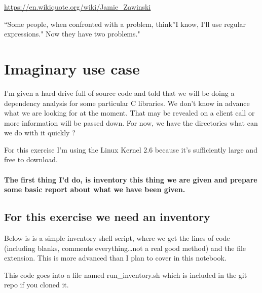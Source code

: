 \documentclass{article}
\begin{document}
\url{https://en.wikiquote.org/wiki/Jamie\_Zawinski}

``Some people, when confronted with a problem, think''I know, I'll use
regular expressions." Now they have two problems."

    \section{Imaginary use case}\label{imaginary-use-case}

I'm given a hard drive full of source code and told that we will be
doing a dependency analysis for some particular C libraries. We don't
know in advance what we are looking for at the moment. That may be
revealed on a client call or more information will be passed down. For
now, we have the directories what can we do with it quickly ?

For this exercise I'm using the Linux Kernel 2.6 because it's
sufficiently large and free to download.

\paragraph{The first thing I'd do, is inventory this thing we are given
and prepare some basic report about what we have been
given.}\label{the-first-thing-id-do-is-inventory-this-thing-we-are-given-and-prepare-some-basic-report-about-what-we-have-been-given.}

    \subsection{For this exercise we need an
inventory}\label{for-this-exercise-we-need-an-inventory}

Below is is a simple inventory shell script, where we get the lines of
code (including blanks, comments everything\ldots{}not a real good
method) and the file extension. This is more advanced than I plan to
cover in this notebook.

This code goes into a file named run\_inventory.sh which is included in
the git repo if you cloned it.
\end{document}
